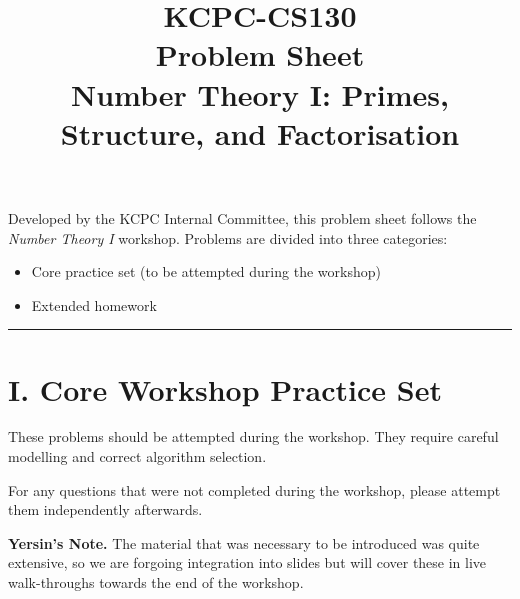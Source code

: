\documentclass[11pt]{article}
\title{KCPC-CS130 \\ Problem Sheet \\ Number Theory I: Primes, Structure, and Factorisation}
\author{}
\date{}
\begin{document}
\maketitle

\noindent
Developed by the KCPC Internal Committee, this problem sheet follows the \textit{Number Theory I} workshop.  
Problems are divided into three categories:
\begin{itemize}
    \item Core practice set (to be attempted during the workshop)
    \item Extended homework
\end{itemize}

\hrule
\vspace{1em}


\section*{I. Core Workshop Practice Set}

These problems should be attempted during the workshop.  
They require careful modelling and correct algorithm selection.

For any questions that were not completed during the workshop, please attempt them independently afterwards.

\textbf{Yersin's Note.} The material that was  necessary to be introduced was quite extensive, so we are forgoing integration into slides but will cover these in live walk-throughs towards the end of the workshop.
\end{document}
